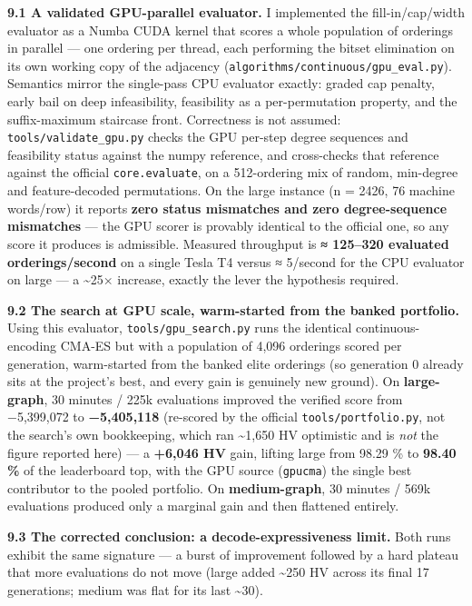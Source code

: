 \documentclass[
  11pt,
]{article}
\begin{document}
\textbf{9.1 A validated GPU-parallel evaluator.} I implemented the
fill-in/cap/width evaluator as a Numba CUDA kernel that scores a whole
population of orderings in parallel --- one ordering per thread, each
performing the bitset elimination on its own working copy of the
adjacency (\texttt{algorithms/continuous/gpu\_eval.py}). Semantics
mirror the single-pass CPU evaluator exactly: graded cap penalty, early
bail on deep infeasibility, feasibility as a per-permutation property,
and the suffix-maximum staircase front. Correctness is not assumed:
\texttt{tools/validate\_gpu.py} checks the GPU per-step degree sequences
and feasibility status against the numpy reference, and cross-checks
that reference against the official \texttt{core.evaluate}, on a
512-ordering mix of random, min-degree and feature-decoded permutations.
On the large instance (n = 2426, 76 machine words/row) it reports
\textbf{zero status mismatches and zero degree-sequence mismatches} ---
the GPU scorer is provably identical to the official one, so any score
it produces is admissible. Measured throughput is \textbf{≈ 125--320
evaluated orderings/second} on a single Tesla T4 versus ≈ 5/second for
the CPU evaluator on large --- a \textasciitilde25× increase, exactly
the lever the hypothesis required.

\textbf{9.2 The search at GPU scale, warm-started from the banked
portfolio.} Using this evaluator, \texttt{tools/gpu\_search.py} runs the
identical continuous-encoding CMA-ES but with a population of 4,096
orderings scored per generation, warm-started from the banked elite
orderings (so generation 0 already sits at the project's best, and every
gain is genuinely new ground). On \textbf{large-graph}, 30 minutes /
225k evaluations improved the verified score from −5,399,072 to
\textbf{−5,405,118} (re-scored by the official
\texttt{tools/portfolio.py}, not the search's own bookkeeping, which ran
\textasciitilde1,650 HV optimistic and is \emph{not} the figure reported
here) --- a \textbf{+6,046 HV} gain, lifting large from 98.29 \% to
\textbf{98.40 \%} of the leaderboard top, with the GPU source
(\texttt{gpucma}) the single best contributor to the pooled portfolio.
On \textbf{medium-graph}, 30 minutes / 569k evaluations produced only a
marginal gain and then flattened entirely.

\textbf{9.3 The corrected conclusion: a decode-expressiveness limit.}
Both runs exhibit the same signature --- a burst of improvement followed
by a hard plateau that more evaluations do not move (large added
\textasciitilde250 HV across its final 17 generations; medium was flat
for its last \textasciitilde30).
\end{document}
